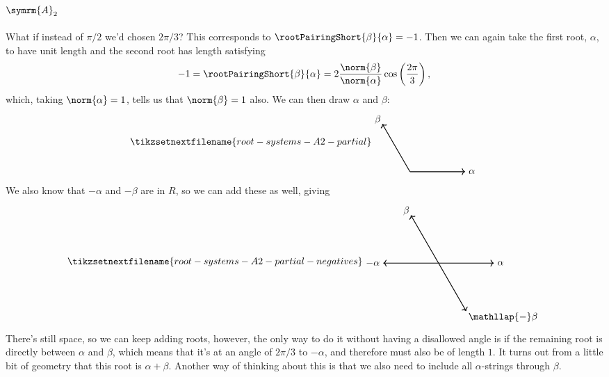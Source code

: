 \documentclass[fleqn]{NotesClass}
\newcommand{\dynkin}[2]{\symrm{#1}_{#2}}
\begin{document}
    \subsection{\texorpdfstring{\(\dynkin{A}{2}\)}{A2}}
    What if instead of \(\pi/2\) we'd chosen \(2\pi/3\)?
    This corresponds to \(\rootPairingShort{\beta}{\alpha} = -1\).
    Then we can again take the first root, \(\alpha\), to have unit length and the second root has length satisfying
    \begin{equation}
        -1 = \rootPairingShort{\beta}{\alpha} = 2\frac{\norm{\beta}}{\norm{\alpha}} \cos \left( \frac{2\pi}{3} \right),
    \end{equation}
    which, taking \(\norm{\alpha} = 1\), tells us that \(\norm{\beta} = 1\) also.
    We can then draw \(\alpha\) and \(\beta\):
    \begin{equation}
        \tikzsetnextfilename{root-systems-A2-partial}
        \begin{tikzpicture}[baseline=(current bounding box)]
            \draw[->, thick] (0, 0) -- (2, 0) node [right] {\(\alpha\)};
            \draw[->, thick] (0, 0) -- (120:2) node [above left, shift={(-60:0.15)}] {\(\beta\)};
        \end{tikzpicture}
    \end{equation}
    We also know that \(-\alpha\) and \(-\beta\) are in \(R\), so we can add these as well, giving
    \begin{equation}
        \tikzsetnextfilename{root-systems-A2-partial-negatives}
        \begin{tikzpicture}[baseline=(current bounding box)]
            \draw[->, thick] (0, 0) -- (2, 0) node [right] {\(\alpha\)};
            \draw[->, thick] (0, 0) -- (120:2) node [above left, shift={(-60:0.15)}] {\(\beta\)};
            \draw[->, thick] (0, 0) -- (-2, 0) node [left] {\(-\alpha\)};
            \draw[->, thick] (0, 0) -- (-60:2) node [below right, shift={(120:0.1)}] {\(\mathllap{-}\beta\)};
        \end{tikzpicture}
    \end{equation}
    There's still space, so we can keep adding roots, however, the only way to do it without having a disallowed angle is if the remaining root is directly between \(\alpha\) and \(\beta\), which means that it's at an angle of \(2\pi/3\) to \(-\alpha\), and therefore must also be of length \(1\).
    It turns out from a little bit of geometry that this root is \(\alpha + \beta\).
    Another way of thinking about this is that we also need to include all \(\alpha\)-strings through \(\beta\).
\end{document}
